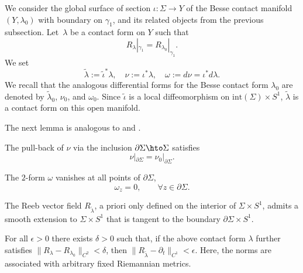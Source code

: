 We consider the global surface of section $\iota:\Sigma\to Y$ of the Besse contact manifold $(Y,\lambda_0)$ with boundary on $\gamma_1$, and its related objects from the previous subsection.
Let~$\lambda$ be a contact form on $Y$ such that
\begin{equation}
\label{e:same_Reeb_on_gamma_1}
R_{\lambda}|_{\gamma_1}=R_{\lambda_0}|_{\gamma_1}.
\end{equation}
We set
\[
\tilde{\lambda} := \tilde\iota^* \lambda, \quad \nu := \iota^* \lambda, \quad \omega := d\nu = \iota^* d\lambda.
\]
We recall that the analogous differential forms for the Besse contact form $\lambda_0$ are denoted by $\tilde\lambda_0$, $\nu_0$, and $\omega_0$. Since $\tilde\iota$ is a local diffeomorphism on $\mathrm{int}(\Sigma) \times S^1$, $\tilde{\lambda}$ is a contact form on this open manifold.

The next lemma is analogous to \cite[Prop.\,3.6]{Abbondandolo:2018fb} and \cite[Prop.\,3.10]{Benedetti:2021aa}.

\skpt
\begin{lem}\label{l:nearly_Besse_normalized}
\begin{enumeratei}

\item\label{l:nearly_Besse_normalizedi}
The pull-back of $\nu$ via the inclusion $\partial\Sigma\hto\Sigma$ satisfies
\[
\nu|_{\partial\Sigma}=\nu_0|_{\partial\Sigma}.
\]

\item\label{l:nearly_Besse_normalizedii}
The $2$-form $\omega$ vanishes at all points of $\partial\Sigma$, \ie
\[
\omega_z= 0,\qquad \forall z\in \partial\Sigma.
\]

\item\label{l:nearly_Besse_normalizediii}
The Reeb vector field $R_{\tilde\lambda}$, a priori only defined on the interior of $\Sigma\times S^1$, admits a smooth extension to $\Sigma\times S^1$ that is tangent to the boundary $\partial \Sigma\times S^1$.

\item\label{l:nearly_Besse_normalizediv}
For all $\epsilon>0$ there exists $\delta>0$ such that, if the above contact form $\lambda$ further satisfies $\|R_\lambda-R_{\lambda_0}\|_{C^2}<\delta$, then $\|R_{\tilde\lambda}-\partial_t\|_{C^1}<\epsilon$. Here, the norms are associated with arbitrary fixed Riemannian metrics.
\end{enumeratei}
\end{lem}

